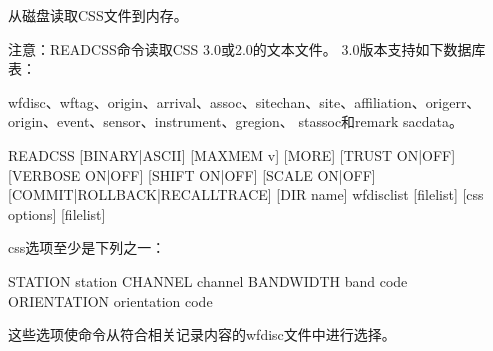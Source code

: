 \label{cmd:readcss}

%
从磁盘读取CSS文件到内存。

注意：READCSS命令读取CSS 3.0或2.0的文本文件。
3.0版本支持如下数据库表：

wfdisc、wftag、origin、arrival、assoc、sitechan、site、affiliation、origerr、origin、event、sensor、instrument、gregion、
stassoc和remark sacdata。

\begin{SACSTX}
READCSS [BINARY|ASCII] [MAXMEM v] [MORE] [TRUST ON|OFF]
[VERBOSE ON|OFF] [SHIFT ON|OFF] [SCALE ON|OFF] [COMMIT|ROLLBACK|RECALLTRACE] 
[DIR name] wfdisclist [filelist] [css options] [filelist]
\end{SACSTX}

css选项至少是下列之一：

\begin{SACSTX}
STATION station
CHANNEL channel
BANDWIDTH band code
ORIENTATION orientation code
\end{SACSTX}

这些选项使命令从符合相关记录内容的wfdisc文件中进行选择。

